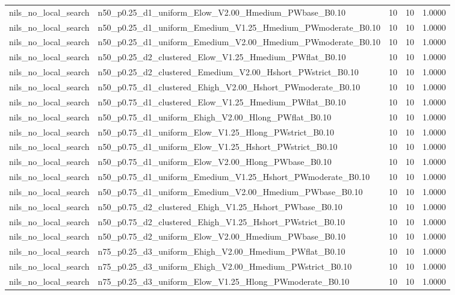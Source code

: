 \begin{tabular}{llrrr}
nils_no_local_search & n50_p0.25_d1_uniform_Elow_V2.00_Hmedium_PWbase_B0.10 & 10 & 10 & 1.0000 \\
nils_no_local_search & n50_p0.25_d1_uniform_Emedium_V1.25_Hmedium_PWmoderate_B0.10 & 10 & 10 & 1.0000 \\
nils_no_local_search & n50_p0.25_d1_uniform_Emedium_V2.00_Hmedium_PWmoderate_B0.10 & 10 & 10 & 1.0000 \\
nils_no_local_search & n50_p0.25_d2_clustered_Elow_V1.25_Hmedium_PWflat_B0.10 & 10 & 10 & 1.0000 \\
nils_no_local_search & n50_p0.25_d2_clustered_Emedium_V2.00_Hshort_PWstrict_B0.10 & 10 & 10 & 1.0000 \\
nils_no_local_search & n50_p0.75_d1_clustered_Ehigh_V2.00_Hshort_PWmoderate_B0.10 & 10 & 10 & 1.0000 \\
nils_no_local_search & n50_p0.75_d1_clustered_Elow_V1.25_Hmedium_PWflat_B0.10 & 10 & 10 & 1.0000 \\
nils_no_local_search & n50_p0.75_d1_uniform_Ehigh_V2.00_Hlong_PWflat_B0.10 & 10 & 10 & 1.0000 \\
nils_no_local_search & n50_p0.75_d1_uniform_Elow_V1.25_Hlong_PWstrict_B0.10 & 10 & 10 & 1.0000 \\
nils_no_local_search & n50_p0.75_d1_uniform_Elow_V1.25_Hshort_PWstrict_B0.10 & 10 & 10 & 1.0000 \\
nils_no_local_search & n50_p0.75_d1_uniform_Elow_V2.00_Hlong_PWbase_B0.10 & 10 & 10 & 1.0000 \\
nils_no_local_search & n50_p0.75_d1_uniform_Emedium_V1.25_Hshort_PWmoderate_B0.10 & 10 & 10 & 1.0000 \\
nils_no_local_search & n50_p0.75_d1_uniform_Emedium_V2.00_Hmedium_PWbase_B0.10 & 10 & 10 & 1.0000 \\
nils_no_local_search & n50_p0.75_d2_clustered_Ehigh_V1.25_Hshort_PWbase_B0.10 & 10 & 10 & 1.0000 \\
nils_no_local_search & n50_p0.75_d2_clustered_Ehigh_V1.25_Hshort_PWstrict_B0.10 & 10 & 10 & 1.0000 \\
nils_no_local_search & n50_p0.75_d2_uniform_Elow_V2.00_Hmedium_PWbase_B0.10 & 10 & 10 & 1.0000 \\
nils_no_local_search & n75_p0.25_d3_uniform_Ehigh_V2.00_Hmedium_PWflat_B0.10 & 10 & 10 & 1.0000 \\
nils_no_local_search & n75_p0.25_d3_uniform_Ehigh_V2.00_Hmedium_PWstrict_B0.10 & 10 & 10 & 1.0000 \\
nils_no_local_search & n75_p0.25_d3_uniform_Elow_V1.25_Hlong_PWmoderate_B0.10 & 10 & 10 & 1.0000 \\

\end{tabular}

